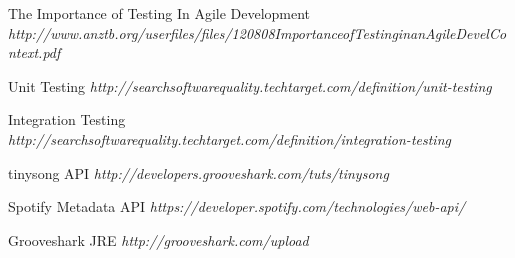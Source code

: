 \documentclass[a4paper, 12pt]{report}
\begin{document}
\begin{thebibliography}{9}
The Importance of Testing In Agile Development \emph{http://www.anztb.org/userfiles/files/120808ImportanceofTestinginanAgileDevelContext.pdf}

Unit Testing \emph{http://searchsoftwarequality.techtarget.com/definition/unit-testing}

Integration Testing \emph{http://searchsoftwarequality.techtarget.com/definition/integration-testing}

tinysong API \emph{http://developers.grooveshark.com/tuts/tinysong}

Spotify Metadata API \emph{https://developer.spotify.com/technologies/web-api/}

Grooveshark JRE \emph{http://grooveshark.com/upload}
\end{thebibliography}
\end{document}
